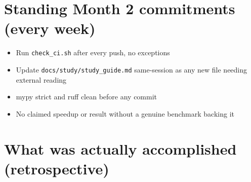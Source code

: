 \documentclass[11pt]{article}
\begin{document}
\section*{Standing Month 2 commitments (every week)}
\begin{itemize}[leftmargin=*]
  \item Run \texttt{check\_ci.sh} after every push, no exceptions
  \item Update \texttt{docs/study/study\_guide.md} same-session as any
    new file needing external reading
  \item mypy strict and ruff clean before any commit
  \item No claimed speedup or result without a genuine benchmark backing
    it
\end{itemize}


\section*{What was actually accomplished (retrospective)}
\end{document}
